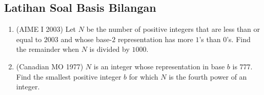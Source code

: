 \subsection{Latihan Soal Basis Bilangan}
\begin{enumerate}
    \item (AIME I 2003) Let $N$ be the number of positive integers that are less than or equal to $2003$ and whose base-$2$ representation has more $1$'s than $0$'s. Find the remainder when $N$ is divided by $1000$.

    \item (Canadian MO 1977) $N$ is an integer whose representation in base $b$ is $777.$ Find the smallest positive integer $b$ for which $N$ is the fourth power of an integer.
\end{enumerate}